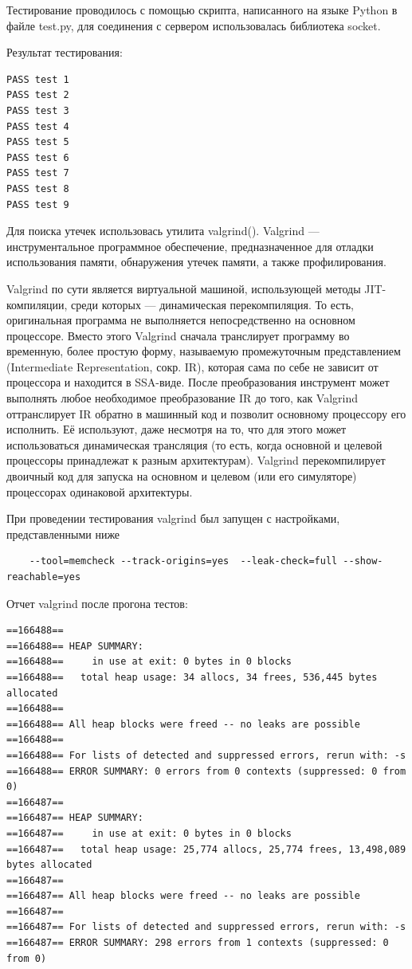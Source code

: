 \documentclass[a4paper,12pt]{report}
\begin{document}
Тестирование проводилось с помощью скрипта, написанного на языке Python в файле test.py, для соединения с сервером использовалась библиотека socket.

Результат тестирования:
\begin{verbatim}
PASS test 1
PASS test 2
PASS test 3
PASS test 4
PASS test 5
PASS test 6
PASS test 7
PASS test 8
PASS test 9
\end{verbatim}


Для поиска утечек использовась утилита valgrind(\cite{valgrind}). Valgrind — инструментальное программное обеспечение, предназначенное для отладки использования памяти, обнаружения утечек памяти, а также профилирования. 

Valgrind по сути является виртуальной машиной, использующей методы JIT-компиляции, среди которых — динамическая перекомпиляция. То есть, оригинальная программа не выполняется непосредственно на основном процессоре. Вместо этого Valgrind сначала транслирует программу во временную, более простую форму, называемую промежуточным представлением (Intermediate Representation, сокр. IR), которая сама по себе не зависит от процессора и находится в SSA-виде. После преобразования инструмент может выполнять любое необходимое преобразование IR до того, как Valgrind оттранслирует IR обратно в машинный код и позволит основному процессору его исполнить. Её используют, даже несмотря на то, что для этого может использоваться динамическая трансляция (то есть, когда основной и целевой процессоры принадлежат к разным архитектурам). Valgrind перекомпилирует двоичный код для запуска на основном и целевом (или его симуляторе) процессорах одинаковой архитектуры.

При проведении тестирования valgrind был запущен с настройками, представленными ниже
\begin{verbatim}
    --tool=memcheck --track-origins=yes  --leak-check=full --show-reachable=yes
\end{verbatim}

Отчет valgrind после прогона тестов:
\begin{verbatim}
==166488== 
==166488== HEAP SUMMARY:
==166488==     in use at exit: 0 bytes in 0 blocks
==166488==   total heap usage: 34 allocs, 34 frees, 536,445 bytes allocated
==166488== 
==166488== All heap blocks were freed -- no leaks are possible
==166488== 
==166488== For lists of detected and suppressed errors, rerun with: -s
==166488== ERROR SUMMARY: 0 errors from 0 contexts (suppressed: 0 from 0)
==166487== 
==166487== HEAP SUMMARY:
==166487==     in use at exit: 0 bytes in 0 blocks
==166487==   total heap usage: 25,774 allocs, 25,774 frees, 13,498,089 bytes allocated
==166487== 
==166487== All heap blocks were freed -- no leaks are possible
==166487== 
==166487== For lists of detected and suppressed errors, rerun with: -s
==166487== ERROR SUMMARY: 298 errors from 1 contexts (suppressed: 0 from 0)
\end{verbatim}
\end{document}
